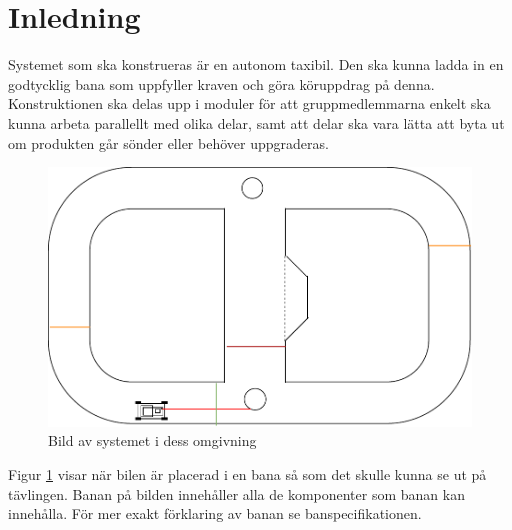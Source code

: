 \documentclass[systemskiss/skiss.tex]{subfiles}
\begin{document}
\section{Inledning}
Systemet som ska konstrueras är en autonom taxibil. Den ska kunna ladda in en
godtycklig bana som uppfyller kraven och göra köruppdrag på denna.
Konstruktionen ska delas upp i moduler för att gruppmedlemmarna enkelt ska
kunna arbeta parallellt med olika delar, samt att delar ska vara lätta att byta
ut om produkten går sönder eller behöver uppgraderas.

\begin{figure}[h]
    \centering
    \includegraphics[width=0.6\linewidth]{systemskiss/figures/systemomgivning.pdf}
    \caption{Bild av systemet i dess omgivning}
    \label{fig:omgivning}
\end{figure}
\noindent
Figur \ref{fig:omgivning} visar när bilen är placerad i en bana så som det
skulle kunna se ut på tävlingen. Banan på bilden innehåller alla de komponenter
som banan kan innehålla. För mer exakt förklaring av banan se
banspecifikationen.
\end{document}
